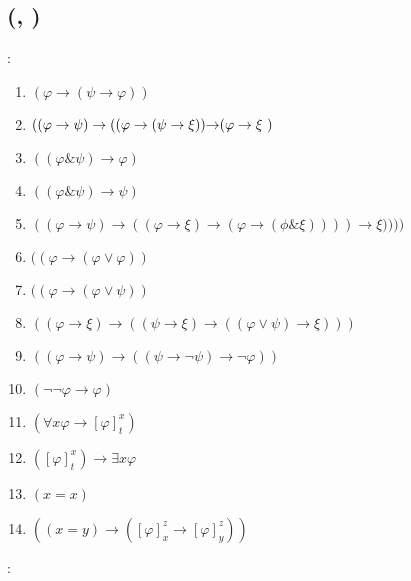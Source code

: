%

\section{\textcyr{\CYRI\cyrs\cyrch\cyri\cyrs\cyrl\cyre\cyrn\cyri\cyre} \textcyr{\cyrp\cyrr\cyre\cyrd\cyri\cyrk\cyra\cyrt\cyro\cyrv}
\textcyr{\CYRG\cyri\cyrl\cyrsftsn\cyrb\cyre\cyrr\cyrt\cyro\cyrv\cyrs\cyrk\cyro\cyrg\cyro}
\textcyr{\cyrt\cyri\cyrp\cyra}}

\subsection{\textcyr{\CYRO\cyrp\cyrr\cyre\cyrd\cyre\cyrl\cyre\cyrn\cyri\cyre}
(\textcyr{\CYRA\cyrk\cyrs\cyri\cyro\cyrm\cyrery}, \textcyr{\cyrp\cyrr\cyra\cyrv\cyri\cyrl\cyra}
\textcyr{\cyrv\cyrery\cyrv\cyro\cyrd\cyra})}

\textcyr{\CYRA\cyrk\cyrs\cyri\cyro\cyrm\cyrery}:
\begin{enumerate}
\item $(\varphi\rightarrow(\psi\rightarrow\varphi))$
\item $((\varphi\rightarrow\psi)\rightarrow((\varphi\rightarrow(\psi\rightarrow\text{\ensuremath{\xi}))\ensuremath{\rightarrow}(\ensuremath{\varphi\rightarrow\xi}\ })$
\item $((\varphi\&\psi)\rightarrow\varphi)$
\item $((\varphi\&\psi)\rightarrow\psi)$
\item $((\varphi\rightarrow\psi)\rightarrow((\varphi\rightarrow\xi)\rightarrow(\varphi\rightarrow(\phi\&\xi))))\rightarrow\xi))))$
\item $((\varphi\rightarrow(\varphi\lor\varphi))$
\item $((\varphi\rightarrow(\varphi\lor\psi))$
\item $((\varphi\rightarrow\xi)\rightarrow((\psi\rightarrow\xi)\rightarrow((\varphi\lor\psi)\rightarrow\xi)))$
\item $((\varphi\rightarrow\psi)\rightarrow((\psi\rightarrow\neg\psi)\rightarrow\neg\varphi))$
\item $(\neg\neg\varphi\rightarrow\varphi)$
\item $(\forall x\varphi\rightarrow[\varphi]_{t}^{x})$
\item $([\varphi]_{t}^{x})\rightarrow\exists x\varphi$
\item $(x=x)$
\item $((x=y)\rightarrow([\varphi]_{x}^{z}\rightarrow[\varphi]_{y}^{z}))$
\end{enumerate}
\textcyr{\CYRP\cyrr\cyra\cyrv\cyri\cyrl\cyra} \textcyr{\cyrv\cyrery\cyrv\cyro\cyrd\cyra}: 

